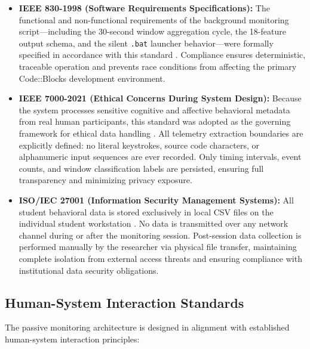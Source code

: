 \begin{itemize}
    \item \textbf{IEEE 830-1998 (Software Requirements Specifications):} The functional and non-functional requirements of the background monitoring script---including the 30-second window aggregation cycle, the 18-feature output schema, and the silent \texttt{.bat} launcher behavior---were formally specified in accordance with this standard \cite{ieee830}. Compliance ensures deterministic, traceable operation and prevents race conditions from affecting the primary Code::Blocks development environment.

    \item \textbf{IEEE 7000-2021 (Ethical Concerns During System Design):} Because the system processes sensitive cognitive and affective behavioral metadata from real human participants, this standard was adopted as the governing framework for ethical data handling \cite{ieee7000}. All telemetry extraction boundaries are explicitly defined: no literal keystrokes, source code characters, or alphanumeric input sequences are ever recorded. Only timing intervals, event counts, and window classification labels are persisted, ensuring full transparency and minimizing privacy exposure.

    \item \textbf{ISO/IEC 27001 (Information Security Management Systems):} All student behavioral data is stored exclusively in local CSV files on the individual student workstation \cite{isoiec27001}. No data is transmitted over any network channel during or after the monitoring session. Post-session data collection is performed manually by the researcher via physical file transfer, maintaining complete isolation from external access threats and ensuring compliance with institutional data security obligations.
\end{itemize}

\subsection{Human-System Interaction Standards}
The passive monitoring architecture is designed in alignment with established human-system interaction principles:

